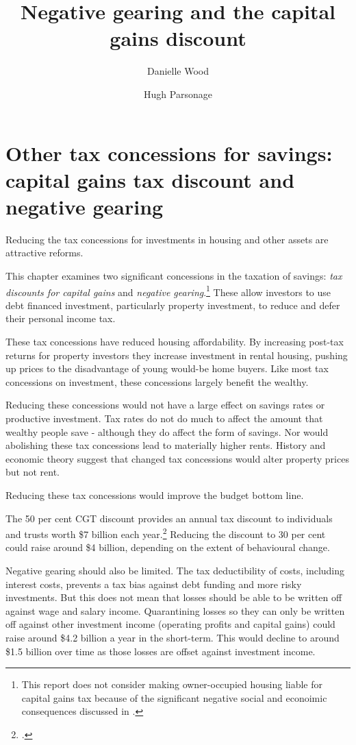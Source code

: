 \documentclass{grattan}\usepackage[]{graphicx}\usepackage[]{color}
\title{Negative gearing and the capital gains discount}
\author{Danielle Wood \and Hugh Parsonage}
\newcommand{\highlight}[1]{\emph{#1}}
\begin{document}
\clearpage


\raggedbottom
\contentspage
\listoffigures
\listoftables

\chapter{Other tax concessions for savings: capital gains tax discount and negative gearing}
Reducing the tax concessions for investments in housing and other assets are attractive reforms. 

This chapter examines two significant concessions in the taxation of savings: \highlight{tax discounts for capital gains} and \highlight{negative gearing}.\footnote{This report does not consider making owner-occupied housing liable for capital gains tax because of the significant negative social and econoimic consequences discussed in \textcite{Daley2013}.}  These allow investors to use debt financed investment, particularly property investment, to reduce and defer their personal income tax.

These tax concessions have reduced housing affordability. By increasing post-tax returns for property investors they increase investment in rental housing, pushing up prices to the disadvantage of young would-be home buyers. Like most tax concessions on investment, these concessions largely benefit the wealthy. 

Reducing these concessions would not have a large effect on savings rates or productive investment. Tax rates do not do much to affect the amount that wealthy people save - although they do affect the form of savings. Nor would abolishing these tax concessions lead to materially higher rents. History and economic theory suggest that changed tax concessions would alter property prices but not rent. 

Reducing these tax concessions would improve the budget bottom line. 

The 50 per cent CGT discount provides an annual tax discount to individuals and trusts worth \$7 billion each year.\footcite[p.~74]{Treasury2015a}  Reducing the discount to 30 per cent could raise around \$4 billion, depending on the extent of behavioural change. 

Negative gearing should also be limited. The tax deductibility of costs, including interest costs, prevents a tax bias against debt funding and more risky investments. But this does not mean that losses should be able to be written off against wage and salary income. Quarantining losses so they can only be written off against other investment income (operating profits and capital gains) could raise around \$4.2 billion a year in the short-term. This would decline to around \$1.5 billion over time as those losses are offset against investment income.  
\end{document}
